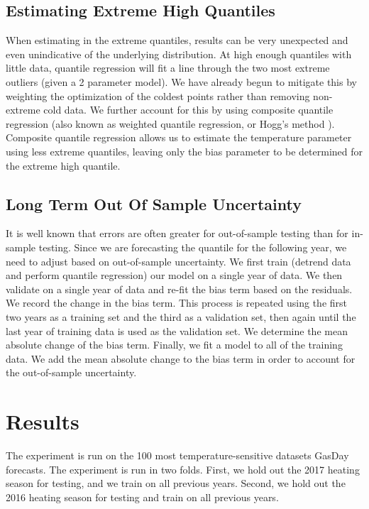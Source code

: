 \documentclass{article}
\begin{document}
\subsection{Estimating Extreme High Quantiles}

When estimating in the extreme quantiles, results can be very unexpected and even unindicative of the underlying distribution. At high enough quantiles with little data, quantile regression will fit a line through the two most extreme outliers (given a 2 parameter model). We have already begun to mitigate this by weighting the optimization of the coldest points rather than removing non-extreme cold data. We further account for this by using composite quantile regression (also known as weighted quantile regression, or Hogg's method \cite{koenker2004quantile}). Composite quantile regression allows us to estimate the temperature parameter using less extreme quantiles, leaving only the bias parameter to be determined for the extreme high quantile.

\subsection{Long Term Out Of Sample Uncertainty} \label{longterm}

It is well known that errors are often greater for out-of-sample testing than for in-sample testing. Since we are forecasting the quantile for the following year, we need to adjust based on out-of-sample uncertainty. We first train (detrend data and perform quantile regression) our model on a single year of data. We then validate on a single year of data and re-fit the bias term based on the residuals. We record the change in the bias term. This process is repeated using the first two years as a training set and the third as a validation set, then again until the last year of training data is used as the validation set. We determine the mean absolute change of the bias term. Finally, we fit a model to all of the training data. We add the mean absolute change to the bias term in order to account for the out-of-sample uncertainty.

\section{Results}

The experiment is run on the 100 most temperature-sensitive datasets GasDay forecasts. The experiment is run in two folds. First, we hold out the 2017 heating season for testing, and we train on all previous years. Second, we hold out the 2016 heating season for testing and train on all previous years.
\end{document}
